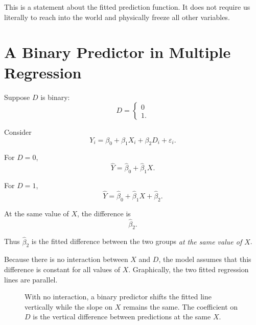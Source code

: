 \documentclass[11pt]{report}
\begin{document}
This is a statement about the fitted prediction function. It does not require us literally to reach into the world and physically freeze all other variables.

\section{A Binary Predictor in Multiple Regression}

Suppose \(D\) is binary:
\[
D=
\begin{cases}
0\\
1.
\end{cases}
\]

Consider
\[
Y_i
=
\beta_0+\beta_1X_i+\beta_2D_i+\varepsilon_i.
\]

For \(D=0\),
\[
\widehat{Y}
=
\widehat{\beta}_0+\widehat{\beta}_1X.
\]

For \(D=1\),
\[
\widehat{Y}
=
\widehat{\beta}_0+\widehat{\beta}_1X+\widehat{\beta}_2.
\]

At the same value of \(X\), the difference is
\[
\widehat{\beta}_2.
\]

Thus \(\widehat{\beta}_2\) is the fitted difference between the two groups \emph{at the same value of \(X\)}.

Because there is no interaction between \(X\) and \(D\), the model assumes that this difference is constant for all values of \(X\). Graphically, the two fitted regression lines are parallel.

\begin{figure}[H]
\centering
{}
\caption{With no interaction, a binary predictor shifts the fitted line vertically while the slope on \(X\) remains the same. The coefficient on \(D\) is the vertical difference between predictions at the same \(X\).}
\label{fig:multiple_parallel}
\end{figure}
\end{document}
